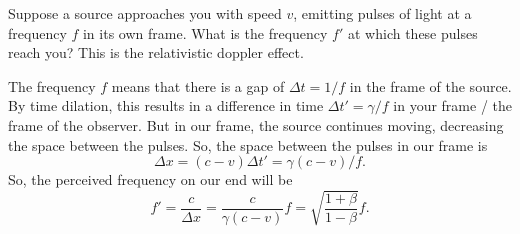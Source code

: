 \documentclass[11pt]{scrartcl}
\begin{document}
\begin{prob}
    Suppose a source approaches you with speed $v$, emitting pulses of light at a frequency $f$ in its own frame. What is the frequency $f'$ at which these pulses reach you? This is the relativistic doppler effect.
\end{prob}
\begin{sol}
    The frequency $f$ means that there is a gap of $\Delta t = 1/f$ in the frame of the source. By time dilation, this results in a difference in time $\Delta t' = \gamma / f$ in your frame / the frame of the observer. But in our frame, the source continues moving, decreasing the space between the pulses. So, the space between the pulses in our frame is
    $$\Delta x = (c - v) \Delta t' = \gamma (c-v)/f.$$
    So, the perceived frequency on our end will be
    $$f' = \frac{c}{\Delta x} = \frac{c}{\gamma (c-v)} f = \sqrt{\frac{1+\beta}{1-\beta}}f.$$
\end{sol}
\end{document}
